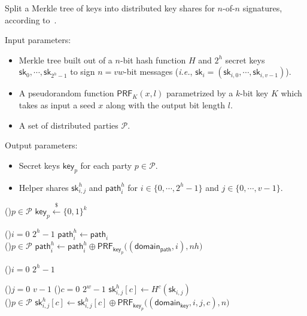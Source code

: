 
\begin{algorithm}[htbp]
    \caption{Split a Merkle tree of \WOTS keys into distributed key shares for $n$-of-$n$ signatures, according to~\cite{cryptoeprint:2022/241}.}
    \begin{algostyle} %
Input parameters:
\vspace{-.75em}
\begin{itemize}
\itemsep-.5em
\item Merkle tree built out of a $n$-bit hash function $H$ and $2^h$ \WOTS secret keys $\mathsf{sk}_0,\cdots,\mathsf{sk}_{2^h-1}$ to sign $n=vw$-bit messages (\textit{i.e.}, $\mathsf{sk}_i = (\mathsf{sk}_{i,0}, \cdots, \mathsf{sk}_{i,v-1})$).
\item A pseudorandom function $\mathsf{PRF}_K(x,l)$ parametrized by a $k$-bit key $K$ which takes as input a seed $x$ along with the output bit length $l$.
\item A set of distributed parties $\mathcal{P}$.
\end{itemize}

Output parameters:
\vspace{-.75em}
\begin{itemize}
\itemsep-.5em
\item Secret keys $\mathsf{key}_p$ for each party $p \in \mathcal{P}$.
\item Helper shares $\mathsf{sk}^h_{i,j}$ and $\mathsf{path}^h_{i}$ for $i \in \{0,\cdots,2^h-1\}$ and $j \in \{0, \cdots, v-1\}$.
\end{itemize}

\ForEach(){$p \in \mathcal{P}$} {
	$\mathsf{key}_p \xleftarrow[]{\$} \{0,1\}^k $ 
}\vspace{1em}

\For(){$i=0$ \KwTo $2^h-1$} {
	$\mathsf{path}^h_i \leftarrow \mathsf{path}_i$\\
	\ForEach(){$p \in \mathcal{P}$} {
		$\mathsf{path}^h_i \leftarrow \mathsf{path}^h_i \oplus \mathsf{PRF}_{\mathsf{key}_p}\big((\mathsf{domain_{path}}, i), nh\big)$
	}
}\vspace{1em}
	
\For(){$i=0$ \KwTo $2^h-1$} {
	\For(){$j=0$ \KwTo $v-1$} {
		\For(){$c=0$ \KwTo $2^w-1$} {
		$\mathsf{sk}^h_{i,j}[c] \leftarrow H^c(\mathsf{sk}_{i,j})$ \\
		\ForEach(){$p \in \mathcal{P}$} {
			$\mathsf{sk}^h_{i,j}[c] \leftarrow \mathsf{sk}^h_{i,j}[c] \oplus \mathsf{PRF}_{\mathsf{key}_p}\big((\mathsf{domain_{key}}, i, j, c), n\big)$
			}
		}
	}

}
\label{alg:bool_split_n}
\end{algostyle}
\end{algorithm}

